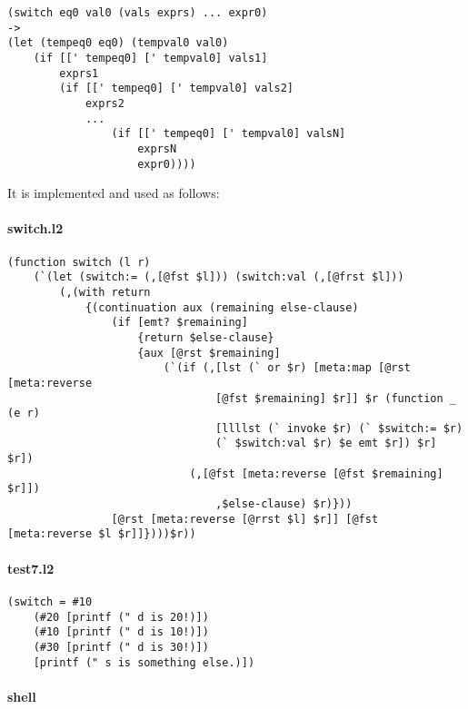 \documentclass[]{article}
\let\oldparagraph\paragraph
\renewcommand{\paragraph}[1]{\oldparagraph{#1}\mbox{}}
\begin{document}
\begin{verbatim}
(switch eq0 val0 (vals exprs) ... expr0)
->
(let (tempeq0 eq0) (tempval0 val0)
    (if [[' tempeq0] [' tempval0] vals1]
        exprs1
        (if [[' tempeq0] [' tempval0] vals2]
            exprs2
            ...
                (if [[' tempeq0] [' tempval0] valsN]
                    exprsN
                    expr0))))
\end{verbatim}

It is implemented and used as follows:

\hypertarget{switch.l2}{%
\paragraph{switch.l2}\label{switch.l2}}

\begin{verbatim}
(function switch (l r)
    (`(let (switch:= (,[@fst $l])) (switch:val (,[@frst $l]))
        (,(with return
            {(continuation aux (remaining else-clause)
                (if [emt? $remaining]
                    {return $else-clause}
                    {aux [@rst $remaining]
                        (`(if (,[lst (` or $r) [meta:map [@rst [meta:reverse
                                [@fst $remaining] $r]] $r (function _ (e r)
                                [llllst (` invoke $r) (` $switch:= $r)
                                (` $switch:val $r) $e emt $r]) $r] $r])
                            (,[@fst [meta:reverse [@fst $remaining] $r]])
                                ,$else-clause) $r)}))
                [@rst [meta:reverse [@rrst $l] $r]] [@fst [meta:reverse $l $r]]})))$r))
\end{verbatim}

\hypertarget{test7.l2}{%
\paragraph{test7.l2}\label{test7.l2}}

\begin{verbatim}
(switch = #10
    (#20 [printf (" d is 20!)])
    (#10 [printf (" d is 10!)])
    (#30 [printf (" d is 30!)])
    [printf (" s is something else.)])
\end{verbatim}

\hypertarget{shell-6}{%
\paragraph{shell}\label{shell-6}}
\end{document}
